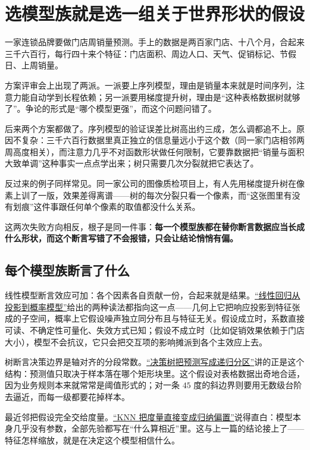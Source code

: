 \section{选模型族就是选一组关于世界形状的假设}
\label{sec:18-Synthesis/01-System-Lifecycle/03}

一家连锁品牌要做门店周销量预测。手上的数据是两百家门店、十八个月，合起来三千六百行，每行四十来个特征：门店面积、周边人口、天气、促销标记、节假日、上周销量。

方案评审会上出现了两派。一派要上序列模型，理由是销量本来就是时间序列，注意力能自动学到长程依赖；另一派要用梯度提升树，理由是``这种表格数据树就够了''。争论的形式是``哪个模型更强''，而这个问题问错了。

后来两个方案都做了。序列模型的验证误差比树高出约三成，怎么调都追不上。原因不复杂：三千六百行数据里真正独立的信息量远小于这个数（同一家门店相邻两周高度相关），而注意力几乎不对函数形状做任何限制，它要靠数据把``销量与面积大致单调''这种事实一点点学出来；树只需要几次分裂就把它表达了。

反过来的例子同样常见。同一家公司的图像质检项目上，有人先用梯度提升树在像素上训了一版，效果差得离谱——树的每次分裂只看一个像素，而``这张图里有没有划痕''这件事跟任何单个像素的取值都没什么关系。

这两次失败方向相反，根子是同一件事：\textbf{每一个模型族都在替你断言数据应当长成什么形状，而这个断言写错了不会报错，只会让结论悄悄有偏。}

\subsection{每个模型族断言了什么}

线性模型断言效应可加：各个因素各自贡献一份，合起来就是结果。\hyperref[sec:13-Machine-Learning/02-Linear-Models/01]{``线性回归从投影到概率模型''}给出的两种读法都指向这一点——几何上它把响应投影到特征张成的子空间，概率上它假设噪声独立同分布且与特征无关。假设成立时，系数直接可读、不确定性可量化、失效方式已知；假设不成立时（比如促销效果依赖于门店大小），模型不会抗议，它只会把交互项的影响摊派到各个主效应上去。

树断言决策边界是轴对齐的分段常数。\hyperref[sec:13-Machine-Learning/03-Trees-Ensembles-and-Neighbors/01]{``决策树把预测写成递归分区''}讲的正是这个结构：预测值只取决于样本落在哪个矩形块里。这个假设对表格数据出奇地合适，因为业务规则本来就常常是阈值形式的；对一条 \(45\) 度的斜边界则要用无数级台阶去逼近，而每一级都要花掉样本。

最近邻把假设完全交给度量。\hyperref[sec:13-Machine-Learning/03-Trees-Ensembles-and-Neighbors/03]{``KNN 把度量直接变成归纳偏置''}说得直白：模型本身几乎没有参数，全部先验都写在``什么算相近''里。这与上一篇的结论接上了——特征怎样缩放，就是在决定这个模型相信什么。

